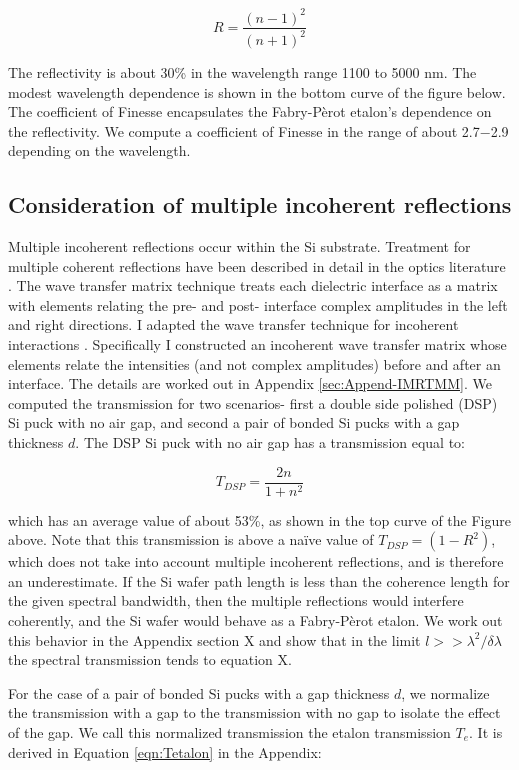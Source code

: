 \documentclass[osajnl,preprint,showpacs,superscriptaddress,12pt]{revtex4-1} %
\begin{document}
$$
R = \frac{(n-1)^2}{(n+1)^2}
$$

The reflectivity is about 30\% in the wavelength range 1100 to 5000 nm.  The modest wavelength dependence is shown in the bottom curve of the figure below.  The coefficient of Finesse\cite{2007fuph.book.....S} encapsulates the Fabry-P\`erot etalon's dependence on the reflectivity.  We compute a coefficient of Finesse in the range of about 2.7$-$2.9 depending on the wavelength.


\subsection{Consideration of multiple incoherent reflections}
Multiple incoherent reflections occur within the Si substrate.  Treatment for multiple coherent reflections have been described in detail in the optics literature \cite{2007fuph.book.....S}.  The wave transfer matrix technique treats each dielectric interface as a matrix with elements relating the pre- and post- interface complex amplitudes in the left and right directions.  I adapted the wave transfer technique for incoherent interactions \cite{2002ApOpt..41.3978K}.  Specifically I constructed an incoherent wave transfer matrix whose elements relate the intensities (and not complex amplitudes) before and after an interface.  The details are worked out in Appendix \ref{sec:Append-IMRTMM}.  We computed the transmission for two scenarios- first a double side polished (DSP) Si puck with no air gap, and second a pair of bonded Si pucks with a gap thickness $d$.  The DSP Si puck with no air gap has a transmission equal to:

$$
T_{DSP} = \frac{2n}{1+n^2}
$$

which has an average value of about 53\%, as shown in the top curve of the Figure above.  Note that this transmission is above a na\"ive value of $T_{DSP}=(1-R^2)$, which does not take into account multiple incoherent reflections, and is therefore an underestimate.  If the Si wafer path length is less than the coherence length for the given spectral bandwidth, then the multiple reflections would interfere coherently, and the Si wafer would behave as a Fabry-P\`erot etalon.  We work out this behavior in the Appendix section X and show that in the limit $l>> \lambda^2 / \delta \lambda $ the spectral transmission tends to equation X.  

For the case of a pair of bonded Si pucks with a gap thickness $d$, we normalize the transmission with a gap to the transmission with no gap to isolate the effect of the gap.  We call this normalized transmission the etalon transmission $T_{e}$.  It is derived in Equation \ref{eqn:Tetalon} in the Appendix:
\end{document}
